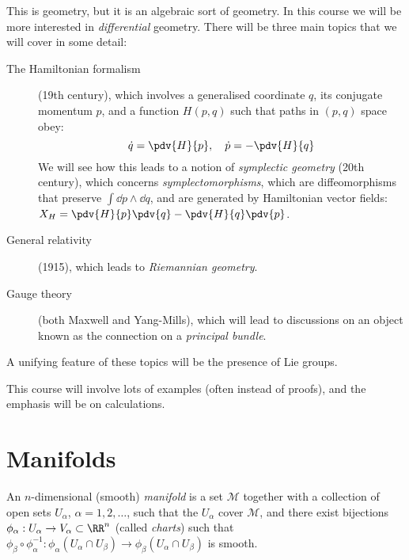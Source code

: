 \documentclass{jknotes}
\begin{document}
This is geometry, but it is an algebraic sort of geometry. In this course we will be more interested in \emph{differential} geometry. There will be three main topics that we will cover in some detail:
\begin{description}
    \item[The Hamiltonian formalism] (19th century), which involves a generalised coordinate \(q\), its conjugate momentum \(p\), and a function \(H(p,q)\) such that paths in \((p,q)\) space obey:
        \begin{equation}
            \dot{q}=\pdv{H}{p},\quad\dot{p}=-\pdv{H}{q}
        \end{equation}
        We will see how this leads to a notion of \emph{symplectic geometry} (20th century), which concerns \emph{symplectomorphisms}, which are diffeomorphisms that preserve \(\int\dd{p}\wedge\dd{q}\), and are generated by Hamiltonian vector fields: \(X_H=\pdv{H}{p}\pdv{q}-\pdv{H}{q}\pdv{p}\).
    \item[General relativity] (1915), which leads to \emph{Riemannian geometry}.
    \item[Gauge theory] (both Maxwell and Yang-Mills), which will lead to discussions on an object known as the connection on a \emph{principal bundle}.
\end{description}

A unifying feature of these topics will be the presence of Lie groups.

This course will involve lots of examples (often instead of proofs), and the emphasis will be on calculations.

\section{Manifolds}
\begin{defn}
    An \(n\)-dimensional (smooth) \emph{manifold} is a set \(\mathcal{M}\) together with a collection of open sets \(U_\alpha\), \(\alpha = 1,2,\dots\), such that the \(U_\alpha\) cover \(\mathcal{M}\), and there exist bijections \(\phi_\alpha:U_\alpha\rightarrow V_\alpha\subset\RR^n\) (called \emph{charts}) such that \(\phi_\beta\circ\phi_\alpha^{-1}:\phi_\alpha(U_\alpha\cap U_\beta) \rightarrow \phi_\beta(U_\alpha\cap U_\beta)\) is smooth.
\end{defn}
\end{document}
